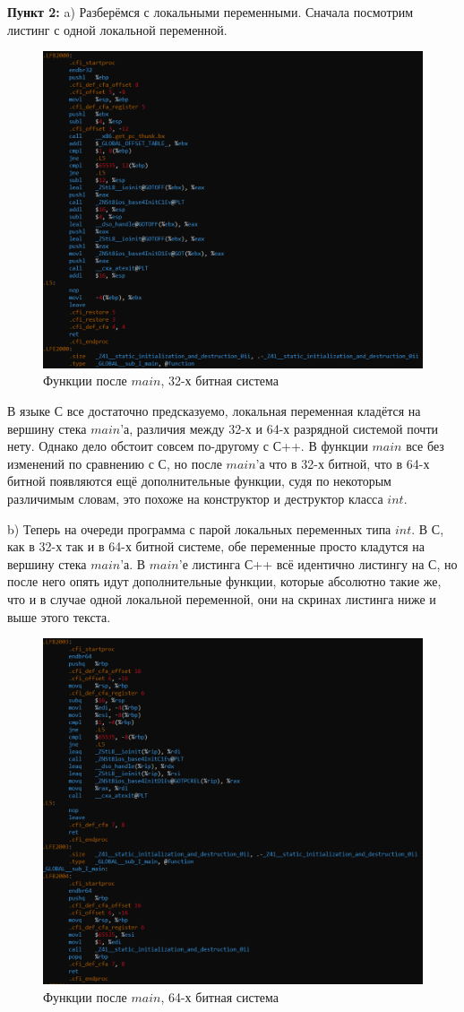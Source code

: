 \documentclass[a4paper,12pt]{article}
\begin{document}
\textbf{Пункт 2:}
a) Разберёмся с локальными переменными. Сначала посмотрим листинг с одной локальной переменной.
\begin{figure}[H]\label{fig: 2aCpp32}
    \centering
    \includegraphics[width = 0.8 \textwidth]{2aCpp32.png}
    \caption{Функции после $main$, 32-х битная система}
\end{figure}
В языке С все достаточно предсказуемо, локальная переменная кладётся на вершину стека $main$'а, различия между 32-х и 64-х разрядной системой почти нету. Однако дело обстоит совсем по-другому с С++. В функции $main$ все без изменений по сравнению с С, но после $main$'а что в 32-х битной, что в 64-х битной появляются ещё дополнительные функции, судя по некоторым различимым словам, это похоже на конструктор и деструктор класса $int$.

b) Теперь на очереди программа с парой локальных переменных типа $int$. В С, как в 32-х так и в 64-х битной системе, обе переменные просто кладутся на вершину стека $main$'а. В $main$'е листинга С++ всё идентично листингу на С, но после него опять 
идут дополнительные функции, которые абсолютно такие же, что и в случае одной локальной переменной, они на скринах листинга ниже и выше этого текста.

\begin{figure}[H]\label{fig: 2aCpp64}
    \centering
    \includegraphics[width = 0.8 \textwidth]{2aCpp64.png}
    \caption{Функции после $main$, 64-х битная система}
\end{figure}
\end{document}
